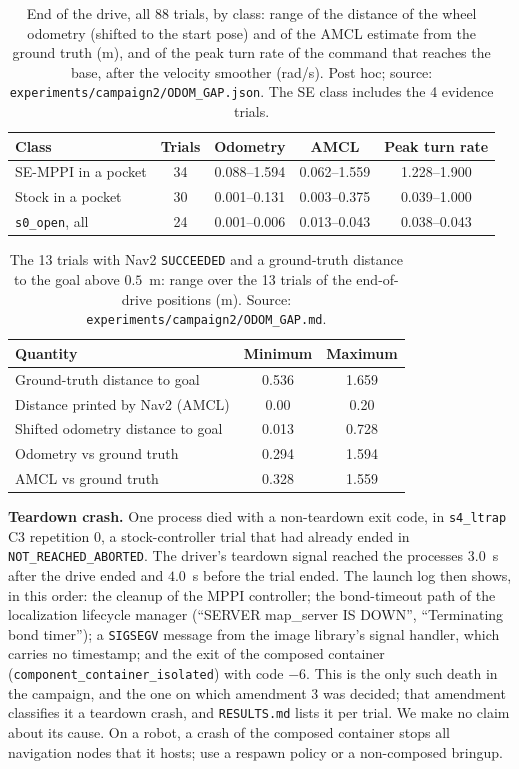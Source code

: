 \documentclass[journal]{IEEEtran}
\begin{document}
\begin{table}[t]
\centering
\caption{End of the drive, all 88 trials, by class: range of the distance of the wheel odometry
(shifted to the start pose) and of the AMCL estimate from the ground truth (m), and of the peak
turn rate of the command that reaches the base, after the velocity smoother (rad/s). Post hoc; source: \texttt{experiments/campaign2/ODOM\_GAP.json}.
The SE class includes the 4 evidence trials.}
\label{tab:odomclass}
\scriptsize
\setlength{\tabcolsep}{2pt}
\begin{tabular}{lcccc}
\toprule
Class & Trials & Odometry & AMCL & Peak turn rate \\
\midrule
SE-MPPI in a pocket & 34 & 0.088--1.594 & 0.062--1.559 & 1.228--1.900 \\
Stock in a pocket & 30 & 0.001--0.131 & 0.003--0.375 & 0.039--1.000 \\
\texttt{s0\_open}, all & 24 & 0.001--0.006 & 0.013--0.043 & 0.038--0.043 \\
\bottomrule
\end{tabular}
\end{table}

\begin{table}[t]
\centering
\caption{The 13 trials with Nav2 \texttt{SUCCEEDED} and a ground-truth distance to the goal above
$0.5$~m: range over the 13 trials of the end-of-drive positions (m). Source:
\texttt{experiments/campaign2/ODOM\_GAP.md}.}
\label{tab:odomgap}
\footnotesize
\begin{tabular}{lcc}
\toprule
Quantity & Minimum & Maximum \\
\midrule
Ground-truth distance to goal & 0.536 & 1.659 \\
Distance printed by Nav2 (AMCL) & 0.00 & 0.20 \\
Shifted odometry distance to goal & 0.013 & 0.728 \\
Odometry vs ground truth & 0.294 & 1.594 \\
AMCL vs ground truth & 0.328 & 1.559 \\
\bottomrule
\end{tabular}
\end{table}

\textbf{Teardown crash.} One process died with a non-teardown exit code, in \texttt{s4\_ltrap}
C3 repetition 0, a stock-controller trial that had already ended in \texttt{NOT\_REACHED\_ABORTED}.
The driver's teardown signal reached the processes $3.0$~s after the drive ended and $4.0$~s before
the trial ended. The launch log then shows, in this order: the cleanup of the MPPI controller; the
bond-timeout path of the localization lifecycle manager (``SERVER map\_server IS DOWN'',
``Terminating bond timer''); a \texttt{SIGSEGV} message from the image library's signal handler,
which carries no timestamp; and the exit of the composed container
(\texttt{component\_container\_isolated}) with code $-6$. This is the only such death in the
campaign, and the one on which amendment 3 was decided; that amendment classifies it a teardown
crash, and \texttt{RESULTS.md} lists it per trial. We make no claim about its cause. On a robot, a
crash of the composed container stops all navigation nodes that it hosts; use a respawn policy or a
non-composed bringup.
\end{document}
